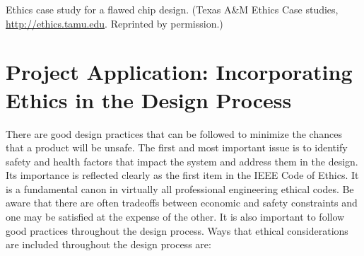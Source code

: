\begin{example}{Ethics case study for a flawed chip design. (Texas
A\&M Ethics Case studies, \url{http://ethics.tamu.edu}. Reprinted by
permission.)  }
\end{example}

\section{Project Application: Incorporating Ethics in the Design Process}
\label{setion:project-application-incorporating-ethics-in-the-design-process}

There are good design practices that can be followed to minimize the
chances that a product will be unsafe. The first and most important
issue is to identify safety and health factors that impact the system
and address them in the design. Its importance is reflected clearly as
the first item in the IEEE Code of Ethics. It is a fundamental canon in
virtually all professional engineering ethical codes. Be aware that
there are often tradeoffs between economic and safety constraints and
one may be satisfied at the expense of the other. It is also important
to follow good practices throughout the design process. Ways that
ethical considerations are included throughout the design process are:

